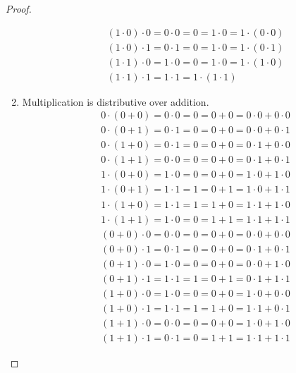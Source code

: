 \begin{proof}
\begin{enumerate}[label = (\arabic*)]
\[\begin{split}
				      &(1 \cdot 0) \cdot 0 = 0 \cdot 0 = 0 = 1 \cdot 0 = 1 \cdot (0 \cdot 0) \\
				      &(1 \cdot 0) \cdot 1 = 0 \cdot 1 = 0 = 1 \cdot 0 = 1 \cdot (0 \cdot 1) \\
				      &(1 \cdot 1) \cdot 0 = 1 \cdot 0 = 0 = 1 \cdot 0 = 1 \cdot (1 \cdot 0) \\
				      &(1 \cdot 1) \cdot 1 = 1 \cdot 1 = 1 \cdot (1 \cdot 1)
			      \end{split}
		      \]
		\item Multiplication is distributive over addition.
		      \[
			      \begin{split}
				      &0\cdot(0 + 0) = 0\cdot 0 = 0 = 0 + 0 = 0\cdot 0 + 0\cdot 0 \\
				      &0\cdot(0 + 1) = 0\cdot 1 = 0 = 0 + 0 = 0\cdot 0 + 0\cdot 1 \\
				      &0\cdot(1 + 0) = 0\cdot 1 = 0 = 0 + 0 = 0\cdot 1 + 0\cdot 0 \\
				      &0\cdot(1 + 1) = 0\cdot 0 = 0 = 0 + 0 = 0\cdot 1 + 0\cdot 1 \\
				      &1\cdot(0 + 0) = 1\cdot 0 = 0 = 0 + 0 = 1\cdot 0 + 1\cdot 0 \\
				      &1\cdot(0 + 1) = 1\cdot 1 = 1 = 0 + 1 = 1\cdot 0 + 1\cdot 1 \\
				      &1\cdot(1 + 0) = 1\cdot 1 = 1 = 1 + 0 = 1\cdot 1 + 1\cdot 0 \\
				      &1\cdot(1 + 1) = 1\cdot 0 = 0 = 1 + 1 = 1\cdot 1 + 1\cdot 1
			      \end{split}
		      \]
		      \[
			      \begin{split}
				      &(0 + 0)\cdot 0 = 0\cdot 0 = 0 = 0 + 0 = 0\cdot 0 + 0\cdot 0 \\
				      &(0 + 0)\cdot 1 = 0\cdot 1 = 0 = 0 + 0 = 0\cdot 1 + 0\cdot 1 \\
				      &(0 + 1)\cdot 0 = 1\cdot 0 = 0 = 0 + 0 = 0\cdot 0 + 1\cdot 0 \\
				      &(0 + 1)\cdot 1 = 1\cdot 1 = 1 = 0 + 1 = 0\cdot 1 + 1\cdot 1 \\
				      &(1 + 0)\cdot 0 = 1\cdot 0 = 0 = 0 + 0 = 1\cdot 0 + 0\cdot 0 \\
				      &(1 + 0)\cdot 1 = 1\cdot 1 = 1 = 1 + 0 = 1\cdot 1 + 0\cdot 1 \\
				      &(1 + 1)\cdot 0 = 0\cdot 0 = 0 = 0 + 0 = 1\cdot 0 + 1\cdot 0 \\
				      &(1 + 1)\cdot 1 = 0\cdot 1 = 0 = 1 + 1 = 1\cdot 1 + 1\cdot 1
			      \end{split}
\]
\end{enumerate}
\end{proof}
